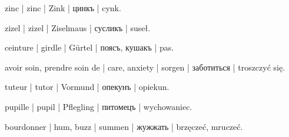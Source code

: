 \begin{outdent}{1em}
zinc | zinc | Zink | цинкъ | cynk.

zizel | zizel | Ziselmaus | сусликъ | suseł.

ceinture | girdle | Gürtel | поясъ, кушакъ | pas.

avoir soin, prendre soin de | care, anxiety | sorgen | заботиться | troszczyć się.

\uvsubentry{}
tuteur | tutor | Vormund | опекунъ | opiekun.

\uvsubentry{}
pupille | pupil | Pflegling | питомецъ | wychowaniec.

bourdonner | hum, buzz | summen | жужжать | brzęczeć, mruczeć.

\end{outdent}
\normalsize

\cleardoublepage